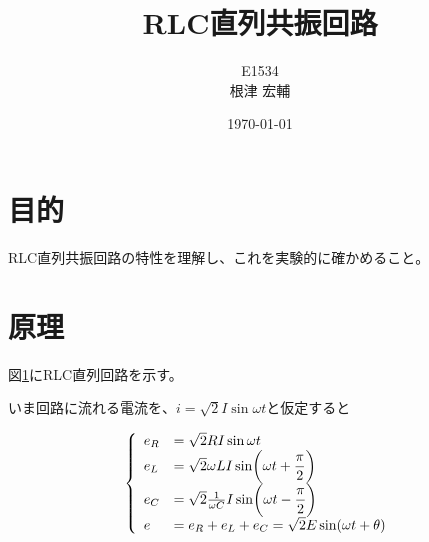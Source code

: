\documentclass[11pt,a4paper,fleqn]{jsarticle}
\title{RLC直列共振回路}
\author{E1534\\根津 宏輔}
\date{\today}
\begin{document}
\section{目的}
RLC直列共振回路の特性を理解し、これを実験的に確かめること。
%
\section{原理}
図\ref{fig:1a}にRLC直列回路を示す。
\begin{figure}[htbp]
\label{fig:1a}
\end{figure}

いま回路に流れる電流を、$i=\sqrt{2}I\sin \omega t$と仮定すると

\begin{eqnarray}
\left\{\vbox to 24pt{} \begin{array}{ll}
e_{R}&=\sqrt{2} RI\sin \omega t\\
e_{L}&=\sqrt{2}\omega LI \sin \biggl( \omega t+\dfrac{\pi}{2}\biggr)\\
e_{C}&=\sqrt{2}\frac{1}{\omega C}I \sin \biggl( \omega t-\dfrac{\pi}{2}\biggr)\\
e&=e_{R}+e_{L}+e_{C}=\sqrt{2}E\sin (\omega t + \theta)
\end{array} \right.
\end{eqnarray}
\end{document}
